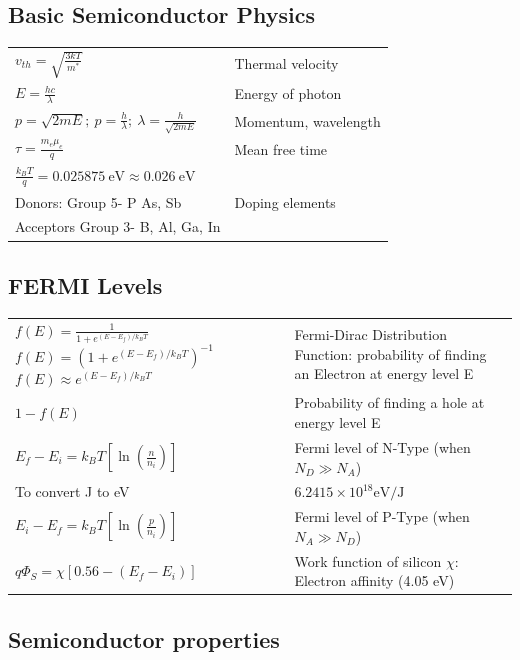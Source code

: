 \begin{multicols}{3}
\subsection{Basic Semiconductor Physics}
\begin{tabular}{p{5.5cm}p{2.75cm}}
$ v_{th}= \sqrt{\frac{3kT}{m^\ast}} $ & Thermal velocity  \\ %
$ E= \frac{hc}{\lambda} $ & Energy of photon \\ %
$p=\sqrt{2mE}; \ p=\frac{h}{\lambda}; \ \lambda=\frac{h}{\sqrt{2mE}}$ & Momentum, wavelength \\
$\tau=\frac{m_e \mu_e}{q}$ & Mean free time \\
$\frac{k_BT}{q}=0.025875 \ \text{eV} \approx 0.026 \ \text{eV}$ & \\
Donors: Group 5- P As, Sb & Doping elements \\
Acceptors Group 3- B, Al, Ga, In
\end{tabular}
\subsection{FERMI Levels}
\begin{tabular}{p{4.25cm}p{4cm}}
$f(E)=\frac{1}{1+e^{(E-E_f)/k_BT}}$ 
$f(E)=(1+e^{(E-E_f)/k_BT})^{-1}$
$f(E) \approx e^{(E-E_f)/k_BT}$
& Fermi-Dirac Distribution Function: probability of finding an Electron at energy level E \\
$1-f(E)$ & Probability of finding a hole at energy level E \\
$E_f-E_i=k_BT\left[\ln \left(\frac{n}{n_i} \right)\right]$ & Fermi level of N-Type (when $N_D \gg N_A$) 
\\
To convert J to eV & $6.2415 \times 10^{18} \text{eV/J}$ \\
$E_i-E_f=k_BT\left[\ln \left(\frac{p}{n_i} \right)\right]$ & Fermi level of P-Type (when $N_A \gg N_D$) \\
$q\Phi_S = \chi [0.56-(E_f-E_i)]$ & Work function of silicon $\chi$: Electron affinity (4.05 eV) %
\end{tabular}
\subsection{Semiconductor properties}


\end{multicols}
